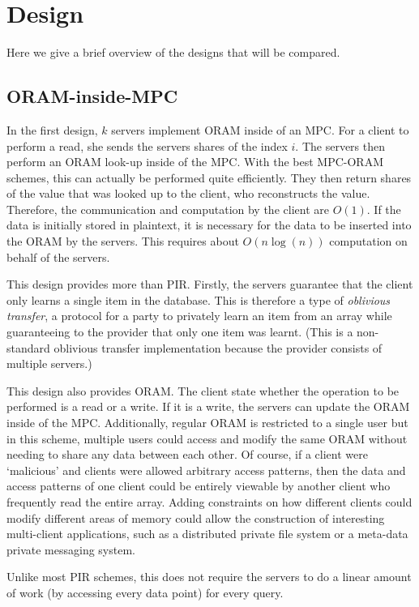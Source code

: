 \section{Design}

Here we give a brief overview of the designs that will be compared.

\subsection{ORAM-inside-MPC}
In the first design, $k$ servers implement ORAM inside of an MPC.
For a client to perform a read, she sends the servers shares
of the index $i$.
The servers then perform an ORAM look-up inside of the MPC.
With the best MPC-ORAM schemes, this can actually be performed
quite efficiently. They then return shares of the value
that was looked up to the client, who reconstructs the value.
Therefore, the communication and computation by the client are $O(1)$.
If the data is initially stored in plaintext, it is necessary
for the data to be inserted into the ORAM by the servers. This requires
about $O(n \log(n))$ computation on behalf of the servers.

This design provides more than PIR. 
Firstly, the servers guarantee that the client only learns a 
single item in the database.
This is therefore a type of \emph{oblivious transfer}, 
a protocol for a party to privately learn an item from an array
while guaranteeing to the provider that only one item was learnt.
(This is a non-standard oblivious transfer implementation 
because the provider consists of multiple servers.)

This design also provides ORAM.
The client state whether the operation to be performed is a read
or a write. If it is a write, the servers can update the ORAM 
inside of the MPC. 
Additionally, regular ORAM is restricted to a single user
but in this scheme, multiple users could access and modify
the same ORAM without needing to share any data between each other.
Of course, if a client were `malicious' and clients were allowed
arbitrary access patterns, then the data and access patterns of
one client could be entirely viewable by another client who
frequently read the entire array.
Adding constraints on how different clients could modify different
areas of memory could allow the construction of interesting
multi-client applications, such as a distributed private file system
or a meta-data private messaging system.

Unlike most PIR schemes, this does not require the servers to
do a linear amount of work (by accessing every data point)
for every query.


